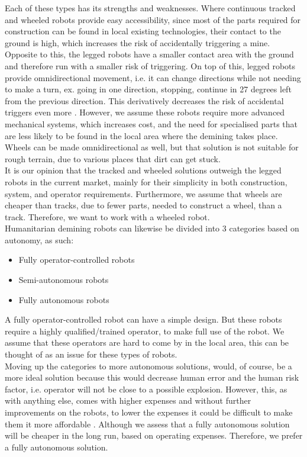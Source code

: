 Each of these types has its strengths and weaknesses. Where continuous tracked and wheeled robots provide easy accessibility, since most of the parts required for construction can be found in local existing technologies, their contact to the ground is high, which increases the risk of accidentally triggering a mine. Opposite to this, the legged robots have a smaller contact area with the ground and therefore run with a smaller risk of triggering. On top of this, legged robots provide omnidirectional movement, i.e. it can change directions while not needing to make a turn, ex. going in one direction, stopping, continue in 27 degrees left from the previous direction. This derivatively decreases the risk of accidental triggers even more \cite{6LeggedRobot2007}. However, we assume these robots require more advanced mechanical systems, which increases cost, and the need for specialised parts that are less likely to be found in the local area where the demining takes place. Wheels can be made omnidirectional as well, but that solution is not suitable for rough terrain, due to various places that dirt can get stuck.\\

It is our opinion that the tracked and wheeled solutions outweigh the legged robots in the current market, mainly for their simplicity in both construction, system, and operator requirements. Furthermore, we assume that wheels are cheaper than tracks, due to fewer parts, needed to construct a wheel, than a track. Therefore, we want to work with a wheeled robot.\\

Humanitarian demining robots can likewise be divided into 3 categories based on autonomy, as such:
\begin{itemize}
\setlength{\itemsep}{0.05\baselineskip}
	\item Fully operator-controlled robots
	\item Semi-autonomous robots
	\item Fully autonomous robots
\end{itemize}

A fully operator-controlled robot can have a simple design. But these robots require a highly qualified/trained operator, to make full use of the robot. We assume that these operators are hard to come by in the local area, this can be thought of as an issue for these types of robots.\\

Moving up the categories to more autonomous solutions, would, of course, be a more ideal solution because this would decrease human error and the human risk factor, i.e. operator will not be close to a possible explosion. However, this, as with anything else, comes with higher expenses and without further improvements on the robots, to lower the expenses it could be difficult to make them it more affordable \cite{6LeggedRobot2007}. Although we assess that a fully autonomous solution will be cheaper in the long run, based on operating expenses. Therefore, we prefer a fully autonomous solution.

